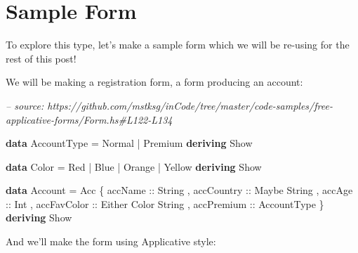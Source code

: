 \documentclass[]{article}
\newenvironment{Shaded}{}{}
\newcommand{\CommentTok}[1]{\textcolor[rgb]{0.38,0.63,0.69}{\textit{#1}}}
\newcommand{\DataTypeTok}[1]{\textcolor[rgb]{0.56,0.13,0.00}{#1}}
\newcommand{\FunctionTok}[1]{\textcolor[rgb]{0.02,0.16,0.49}{#1}}
\newcommand{\KeywordTok}[1]{\textcolor[rgb]{0.00,0.44,0.13}{\textbf{#1}}}
\newcommand{\NormalTok}[1]{#1}
\newcommand{\OtherTok}[1]{\textcolor[rgb]{0.00,0.44,0.13}{#1}}
\begin{document}
\hypertarget{sample-form}{%
\section{Sample Form}\label{sample-form}}

To explore this type, let's make a sample form which we will be re-using for the
rest of this post!

We will be making a registration form, a form producing an account:

\begin{Shaded}
\begin{Highlighting}[]
\CommentTok{-- source: https://github.com/mstksg/inCode/tree/master/code-samples/free-applicative-forms/Form.hs#L122-L134}

\KeywordTok{data} \DataTypeTok{AccountType} \FunctionTok{=} \DataTypeTok{Normal} \FunctionTok{|} \DataTypeTok{Premium}
    \KeywordTok{deriving} \DataTypeTok{Show}

\KeywordTok{data} \DataTypeTok{Color} \FunctionTok{=} \DataTypeTok{Red} \FunctionTok{|} \DataTypeTok{Blue} \FunctionTok{|} \DataTypeTok{Orange} \FunctionTok{|} \DataTypeTok{Yellow}
    \KeywordTok{deriving} \DataTypeTok{Show}

\KeywordTok{data} \DataTypeTok{Account} \FunctionTok{=} \DataTypeTok{Acc}\NormalTok{ \{}\OtherTok{ accName     ::} \DataTypeTok{String}
\NormalTok{                   ,}\OtherTok{ accCountry  ::} \DataTypeTok{Maybe} \DataTypeTok{String}
\NormalTok{                   ,}\OtherTok{ accAge      ::} \DataTypeTok{Int}
\NormalTok{                   ,}\OtherTok{ accFavColor ::} \DataTypeTok{Either} \DataTypeTok{Color} \DataTypeTok{String}
\NormalTok{                   ,}\OtherTok{ accPremium  ::} \DataTypeTok{AccountType}
\NormalTok{                   \}}
    \KeywordTok{deriving} \DataTypeTok{Show}
\end{Highlighting}
\end{Shaded}

And we'll make the form using Applicative style:
\end{document}
